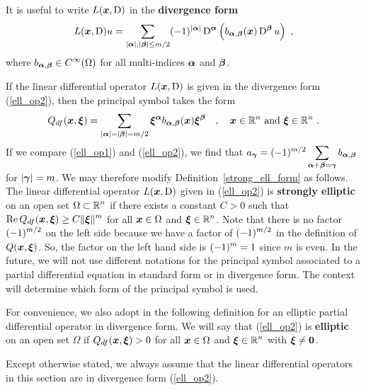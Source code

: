 It is useful to write $L({\bm{x}},\operatorname{D})$ in the {\bfseries divergence form}%
\begin{equation} \label{ell_op2}
L({\bm{x}},\operatorname{D})u = \sum_{|{\bm{\alpha}}|,|{\bm{\beta}}|\leq m/2}
(-1)^{|{\bm{\alpha}}|} \operatorname{D}^{{\bm{\alpha}}}
\left( b_{{\bm{\alpha}},{\bm{\beta}}}({\bm{x}}) \operatorname{D}^{{\bm{\beta}}} u\right) \ ,
\end{equation}
where $\displaystyle b_{{\bm{\alpha}},{\bm{\beta}}} \in C^\infty(\Omega)$ for all
multi-indices ${\bm{\alpha}}$ and ${\bm{\beta}}$.

If the linear differential operator $L({\bm{x}},\operatorname{D})$ is given in the
divergence form (\ref{ell_op2}), then the principal symbol takes the
form
\[
Q_{df}({\bm{x}}, {\bm{\xi}}) = \sum_{|{\bm{\alpha}}|=|{\bm{\beta}}|=m/2}
{\bm{\xi}}^{{\bm{\alpha}}}
b_{{\bm{\alpha}},{\bm{\beta}}}({\bm{x}}) {\bm{\xi}}^{{\bm{\beta}}} \quad ,
\quad {\bm{x}} \in \mathbb{R}^n \ \text{and} \ {\bm{\xi}} \in \mathbb{R}^n \ .
\]
If we compare (\ref{ell_op1}) and (\ref{ell_op2}), we find that
$\displaystyle a_{{\bm{\gamma}}} = (-1)^{m/2}
\sum_{{\bm{\alpha}}+{\bm{\beta}}={\bm{\gamma}}} b_{{\bm{\alpha}},{\bm{\beta}}}$
for $|{\bm{\gamma}}|= m$.
We may therefore modify Definition~\ref{strong_ell_form} as
follows.  The linear differential operator $L({\bm{x}},\operatorname{D})$ given in
(\ref{ell_op2}) is {\bfseries strongly elliptic}
on an open set $\displaystyle \Omega \subset \mathbb{R}^n$ if there exists a
constant $C>0$ such that
$\displaystyle \operatorname{Re} Q_{df}({\bm{x}}, {\bm{\xi}}) \geq C \|{\bm{\xi}}\|^m$
for all ${\bm{x}} \in \Omega$ and $\displaystyle {\bm{\xi}} \in \mathbb{R}^n$.
Note that there is no factor $\displaystyle (-1)^{m/2}$ on the left
side because we have a factor of $\displaystyle (-1)^{m/2}$ in the
definition of $Q({\bm{x}},{\bm{\xi}})$.  So, the factor on the left hand side is
$\displaystyle (-1)^m =1$ since $m$ is even.
In the future, we will not use different notations for the principal
symbol associated to a partial differential equation in standard form
or in divergence form.  The context will determine which form of the
principal symbol is used.

For convenience, we also adopt in the following definition for an
elliptic partial differential operator in divergence form.  We will
say that (\ref{ell_op2}) is {\bfseries elliptic} on an
open set $\Omega$ if $Q_{df}({\bm{x}}, {\bm{\xi}}) > 0$ for all
${\bm{x}} \in \Omega$ and $\displaystyle {\bm{\xi}} \in \mathbb{R}^n$ with
${\bm{\xi}} \neq {\bm{0}}$.

Except otherwise stated, we always assume that the linear differential
operators in this section are in divergence form (\ref{ell_op2}).

